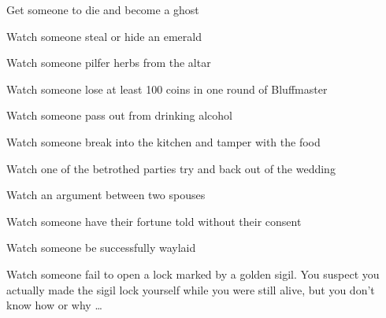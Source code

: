 \documentclass[char]{Kos}
\begin{document}
\begin{itemz}[Goals]
 \item Get someone to die and become a ghost
 \item Watch someone steal or hide an emerald
 \item Watch someone pilfer herbs from the altar
 \item Watch someone lose at least 100 coins in one round of Bluffmaster
 \item Watch someone pass out from drinking alcohol
 \item Watch someone break into the kitchen and tamper with the food
 \item Watch one of the betrothed parties try and back out of the wedding
 \item Watch an argument between two spouses
 \item Watch someone have their fortune told without their consent
  \item Watch someone be successfully waylaid
  \item Watch someone fail to open a lock marked by a golden sigil. You suspect you actually made the sigil lock yourself while you were still alive, but you don't know how or why \ldots
\end{itemz}
\end{document}
